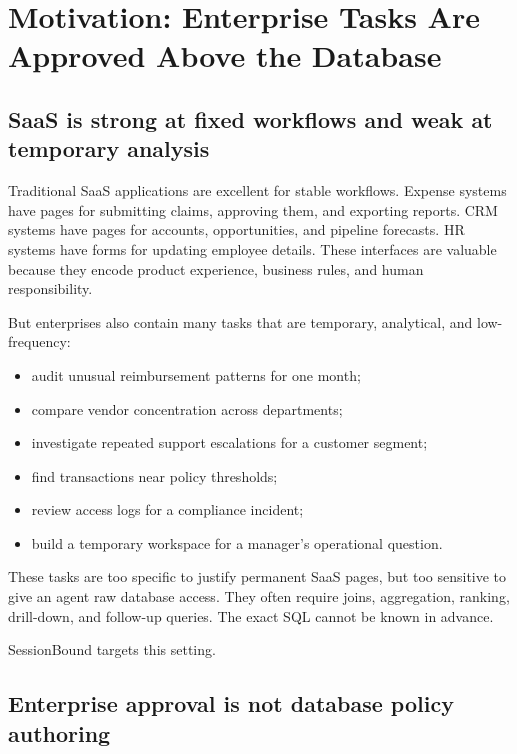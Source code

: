 \documentclass[journal]{IEEEtran}
\providecommand{\tightlist}{%
  \setlength{\itemsep}{0pt}\setlength{\parskip}{0pt}}
\begin{document}
\hypertarget{motivation-enterprise-tasks-are-approved-above-the-database}{%
\section{Motivation: Enterprise Tasks Are Approved Above the
Database}\label{motivation-enterprise-tasks-are-approved-above-the-database}}

\hypertarget{saas-is-strong-at-fixed-workflows-and-weak-at-temporary-analysis}{%
\subsection{SaaS is strong at fixed workflows and weak at
temporary
analysis}\label{saas-is-strong-at-fixed-workflows-and-weak-at-temporary-analysis}}

Traditional SaaS applications are excellent for stable workflows.
Expense systems have pages for submitting claims, approving them, and
exporting reports. CRM systems have pages for accounts, opportunities,
and pipeline forecasts. HR systems have forms for updating employee
details. These interfaces are valuable because they encode product
experience, business rules, and human responsibility.

But enterprises also contain many tasks that are temporary, analytical,
and low-frequency:

\begin{itemize}
\tightlist
\item
  audit unusual reimbursement patterns for one month;
\item
  compare vendor concentration across departments;
\item
  investigate repeated support escalations for a customer segment;
\item
  find transactions near policy thresholds;
\item
  review access logs for a compliance incident;
\item
  build a temporary workspace for a manager's operational question.
\end{itemize}

These tasks are too specific to justify permanent SaaS pages, but too
sensitive to give an agent raw database access. They often require
joins, aggregation, ranking, drill-down, and follow-up queries. The
exact SQL cannot be known in advance.

SessionBound targets this setting.

\hypertarget{enterprise-approval-is-not-database-policy-authoring}{%
\subsection{Enterprise approval is not database policy
authoring}\label{enterprise-approval-is-not-database-policy-authoring}}
\end{document}
